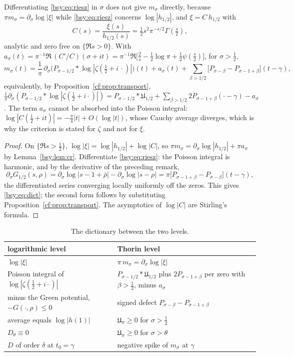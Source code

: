 \noindent Differentiating \eqref{bsy:eq:riesz} in $\sigma$ does not give $m_\sigma$ directly, because $\pi m_\sigma=\partial_\sigma\log|\xi|$ while \eqref{bsy:eq:riesz} concerns $\log|h_{1/2}|$, and $\xi=C\,h_{1/2}$ with
\[
C(s)=\frac{\xi(s)}{h_{1/2}(s)}=\tfrac12s^2\pi^{-s/2}\Gamma(\tfrac s2),
\]
analytic and zero free on $\{\Re s>0\}$. With $a_\sigma(t)=\pi^{-1}\Re\,(C'/C)(\sigma+it)=\pi^{-1}\Re\bigl[\frac2s-\frac12\log\pi+\frac12\psi(\frac s2)\bigr]$, for $\sigma>\frac12$,
\begin{equation}\label{bsy:eq:dict}
m_\sigma(t)=\frac1\pi\,\partial_\sigma\bigl(P_{\sigma-1/2}*\log|\zeta(\tfrac12+i\,\cdot)|\bigr)(t)+a_\sigma(t)+\sum_{\beta>1/2}\bigl[P_{\sigma-\beta}-P_{\sigma-1+\beta}\bigr](t-\gamma),
\end{equation}
equivalently, by Proposition~\ref{cf:prop:transport}, $\frac1\pi\partial_\sigma(P_{\sigma-1/2}*\log|\zeta(\frac12+i\cdot)|)=P_{\sigma-1/2}*\mathfrak U_{1/2}+\sum_{\beta>1/2}2P_{\sigma-1+\beta}(\cdot-\gamma)-a_\sigma$. The term $a_\sigma$ cannot be absorbed into the Poisson integral: $\log|C(\frac12+it)|=-\frac\pi4|t|+O(\log|t|)$, whose Cauchy average diverges, which is why the criterion is stated for $\zeta$ and not for $\xi$.

\begin{proof}
On $\{\Re s>\frac12\}$, $\log|\xi|=\log|h_{1/2}|+\log|C|$, so $\pi m_\sigma=\partial_\sigma\log|h_{1/2}|+\pi a_\sigma$ by Lemma~\ref{bsy:lem:cr}. Differentiate \eqref{bsy:eq:riesz}: the Poisson integral is harmonic, and by the derivative of the preceding remark,
\[
\partial_\sigma G_{1/2}(s,\rho)=\partial_\sigma\log|s-1+\bar\rho|-\partial_\sigma\log|s-\rho|=\pi\bigl[P_{\sigma-1+\beta}-P_{\sigma-\beta}\bigr](t-\gamma),
\]
the differentiated series converging locally uniformly off the zeros. This gives \eqref{bsy:eq:dict}; the second form follows by substituting Proposition~\ref{cf:prop:transport}. The asymptotics of $\log|C|$ are Stirling's formula.
\end{proof}

\begin{table}[h]
\centering\small
\begin{tabular}{p{2.4in}p{2.5in}}
\toprule
logarithmic level & Thorin level\\
\midrule
$\log|\xi|$ & $\pi\,m_\sigma=\partial_\sigma\log|\xi|$\\
Poisson integral of $\log|\zeta(\frac12+i\cdot)|$ & $P_{\sigma-1/2}*\mathfrak U_{1/2}$ plus $2P_{\sigma-1+\beta}$ per zero with $\beta>\frac12$, minus $a_\sigma$\\
minus the Green potential, $-G(\cdot,\rho)\le0$ & signed defect $P_{\sigma-\beta}-P_{\sigma-1+\beta}$\\
average equals $\log|h(1)|$ & $\mathfrak U_\sigma\ge0$ for $\sigma>\frac12$\\
$D_\theta\equiv0$ & $\mathfrak U_\sigma\ge0$ for $\sigma>\theta$\\
$D$ of order $\delta$ at $t_0=\gamma$ & negative spike of $m_\sigma$ at $\gamma$\\
\bottomrule
\end{tabular}
\caption{The dictionary between the two levels.}
\end{table}

